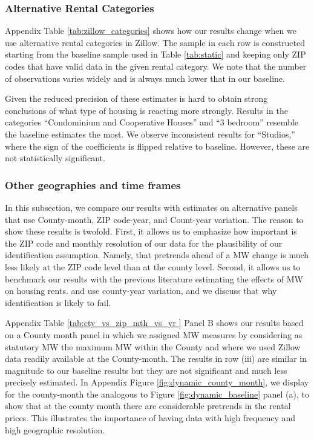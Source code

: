 \subsubsection*{Alternative Rental Categories}

Appendix Table \ref{tab:zillow_categories} shows how our results change when we 
use alternative rental categories in Zillow.
The sample in each row is constructed starting from the baseline sample used in 
Table \ref{tab:static} and keeping only ZIP codes that have valid data in the 
given rental category.
We note that the number of observations varies widely and is always much lower
that in our baseline.

Given the reduced precision of these estimates is hard to obtain strong 
conclusions of what type of housing is reacting more strongly.
Results in the categories ``Condominium and Cooperative Houses'' and ``3 bedroom''
resemble the baseline estimates the most.
We observe inconsistent results for ``Studios,'' where the sign of the 
coefficients is flipped relative to baseline.
However, these are not statistically significant.

\subsubsection*{Other geographies and time frames} \label{sec:oth_geo_time}

In this subsection, we compare our results with estimates on alternative panels
that use County-month, ZIP code-year, and Count-year variation. The reason to show 
these results is twofold. First, it allows us to emphasize how important 
is the ZIP code and monthly resolution of our data for the plausibility of our 
identification assumption. Namely, that pretrends ahead of a MW change is much 
less likely at the ZIP code level than at the county level. Second, it allows us 
to benchmark our results with the previous literature estimating the effects of 
MW on housing rents. \textcite{Yamagishi2019} and \textcite{Tidemann2018} use 
county-year variation, and we discuss that why identification is likely to fail.

Appendix Table \ref{tab:cty_vs_zip_mth_vs_yr } Panel B shows our results based on a County 
month panel in which we assigned MW measures by considering as statutory MW the maximum MW within
the County and where we used Zillow data readily available at the County-month. The results in 
row (iii) are similar in magnitude to our baseline results but they are not significant and 
much less precisely estimated. In Appendix Figure \ref{fig:dynamic_county_month}, we display 
for the county-month the analogous to Figure \ref{fig:dynamic_baseline} panel (a), to show that 
at the county month there are considerable pretrends in the rental prices. This illustrates 
the importance of having data with high frequency and high geographic resolution. 

